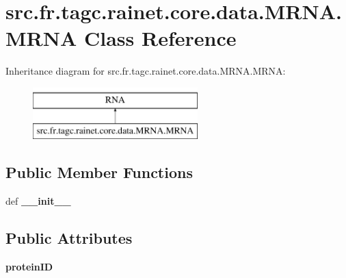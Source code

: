 \hypertarget{classsrc_1_1fr_1_1tagc_1_1rainet_1_1core_1_1data_1_1MRNA_1_1MRNA}{\section{src.\-fr.\-tagc.\-rainet.\-core.\-data.\-M\-R\-N\-A.\-M\-R\-N\-A Class Reference}
\label{classsrc_1_1fr_1_1tagc_1_1rainet_1_1core_1_1data_1_1MRNA_1_1MRNA}
}
Inheritance diagram for src.\-fr.\-tagc.\-rainet.\-core.\-data.\-M\-R\-N\-A.\-M\-R\-N\-A\-:\begin{figure}[H]
\begin{center}
\leavevmode
\includegraphics[height=2.000000cm]{classsrc_1_1fr_1_1tagc_1_1rainet_1_1core_1_1data_1_1MRNA_1_1MRNA}
\end{center}
\end{figure}
\subsection*{Public Member Functions}
\begin{DoxyCompactItemize}
\item 
\hypertarget{classsrc_1_1fr_1_1tagc_1_1rainet_1_1core_1_1data_1_1MRNA_1_1MRNA_a374fb3ea9bb548ab697e4e80aa55f93c}{def {\bfseries \-\_\-\-\_\-init\-\_\-\-\_\-}}\label{classsrc_1_1fr_1_1tagc_1_1rainet_1_1core_1_1data_1_1MRNA_1_1MRNA_a374fb3ea9bb548ab697e4e80aa55f93c}

\end{DoxyCompactItemize}
\subsection*{Public Attributes}
\begin{DoxyCompactItemize}
\item 
\hypertarget{classsrc_1_1fr_1_1tagc_1_1rainet_1_1core_1_1data_1_1MRNA_1_1MRNA_aba511061d3d2861e6d08b5d1d42387bf}{{\bfseries protein\-I\-D}}\label{classsrc_1_1fr_1_1tagc_1_1rainet_1_1core_1_1data_1_1MRNA_1_1MRNA_aba511061d3d2861e6d08b5d1d42387bf}

\end{DoxyCompactItemize}
